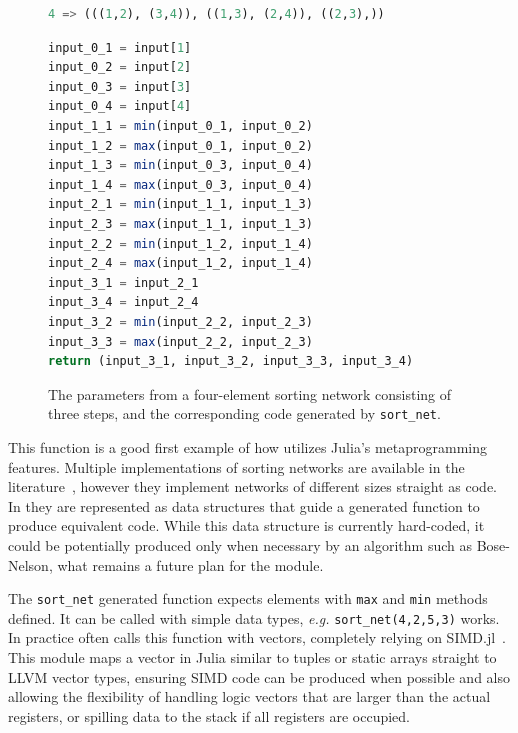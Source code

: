 \documentclass{juliacon}
\begin{document}
\begin{figure}[htb]
\begin{lstlisting}[language = Julia]
4 => (((1,2), (3,4)), ((1,3), (2,4)), ((2,3),))
\end{lstlisting}
\begin{lstlisting}[language = Julia]
input_0_1 = input[1]
input_0_2 = input[2]
input_0_3 = input[3]
input_0_4 = input[4]
input_1_1 = min(input_0_1, input_0_2)
input_1_2 = max(input_0_1, input_0_2)
input_1_3 = min(input_0_3, input_0_4)
input_1_4 = max(input_0_3, input_0_4)
input_2_1 = min(input_1_1, input_1_3)
input_2_3 = max(input_1_1, input_1_3)
input_2_2 = min(input_1_2, input_1_4)
input_2_4 = max(input_1_2, input_1_4)
input_3_1 = input_2_1
input_3_4 = input_2_4
input_3_2 = min(input_2_2, input_2_3)
input_3_3 = max(input_2_2, input_2_3)
return (input_3_1, input_3_2, input_3_3, input_3_4)
\end{lstlisting}
\caption{The parameters from a four-element sorting network consisting of three steps, and the corresponding code generated by {\tt sort\_net}.}
\label{fig:sort-net-listing}
\end{figure}

This function is a good first example of how \chipsort utilizes Julia's metaprogramming features. Multiple implementations of sorting networks are available in the literature~\cite{DBLP:journals/pvldb/ChhuganiNLMHCBKD08,sortingnetworksjl,ultrasort}, however they implement networks of different sizes straight as code. In \chipsort they are represented as data structures that guide a generated function to produce equivalent code. While this data structure is currently hard-coded, it could be potentially produced only when necessary by an algorithm such as Bose-Nelson, what remains a future plan for the module.

The {\tt sort\_net} generated function expects elements with {\tt max} and {\tt min} methods defined. It can be called with simple data types, {\em e.g.} {\tt sort\_net(4,2,5,3)} works. In practice \chipsort often calls this function with vectors, completely relying on SIMD.jl~\cite{erik_schnetter_2019_2592633}. This module maps a vector in Julia similar to tuples or static arrays straight to LLVM vector types, ensuring SIMD code can be produced when possible and also allowing the flexibility of handling logic vectors that are larger than the actual registers, or spilling data to the stack if all registers are occupied.
\end{document}
